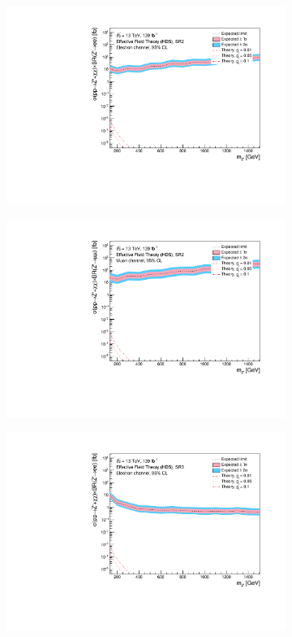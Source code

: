 \documentclass[12pt, a4paper]{book}
\begin{document}
\begin{figure}[!ht]
\begin{subfigure}[b]{0.49\textwidth}
      \includegraphics[width=1\textwidth]{Limits/Model_independent/100-150/EFT_HDS/mass_exclusion_ee.pdf}
   \end{subfigure}
   \hfill
   \begin{subfigure}[b]{0.49\textwidth}
      \centering
      \includegraphics[width=1\textwidth]{Limits/Model_independent/100-150/EFT_HDS/mass_exclusion_uu.pdf}
   \end{subfigure}
   \hfill
	\begin{subfigure}[b]{0.49\textwidth}
      \centering
      \includegraphics[width=1\textwidth]{Limits/Model_independent/150/EFT_HDS/mass_exclusion_ee.pdf}

\end{subfigure}
\end{figure}
\end{document}
